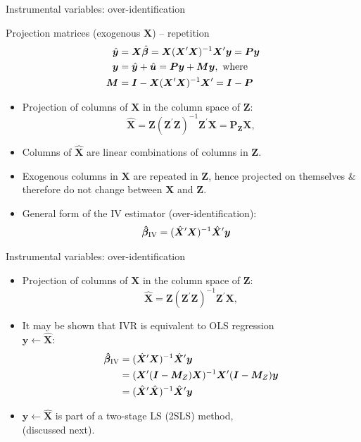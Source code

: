 \documentclass[usenames,dvipsnames]{beamer}
\begin{document}
\begin{frame}{Instrumental variables: over-identification}
\begin{block}{Projection matrices (exogenous $\bm{X}$) -- repetition}
\vspace{-0.5cm}
\begin{align*} 
\hat{\bm{y}} & = \bm{X}\hat{\bm{\beta}} =  
\bm{X}(\bm{X}^{\prime}\bm{X})^{-1} \bm{X}^{\prime}\bm{y} = \bm{Py}\\
\bm{y} & = \hat{\bm{y}} + \hat{\bm{u}} = \bm{Py} + \bm{My}, \textnormal{~where} \\
\bm{M} & = \bm{I}  - \bm{X}(\bm{X}^{\prime}\bm{X})^{-1} \bm{X}^{\prime} = \bm{I} - \bm{P}
\end{align*}
\end{block}
\begin{itemize}
    \item Projection of columns of $\bm{X}$ in the column space of $\bm{Z}$:
$$
\hat{\bm{X}} = 
\bm{Z}(\bm{Z}^{\prime}\bm{Z})^{-1} \bm{Z}^{\prime}\bm{X} = \bm{P}_{\bm{Z}}\bm{X},
$$
\item Columns of $\hat{\bm{X}}$ are linear combinations of columns in $\bm{Z}$. 
\medskip 
\item Exogenous columns in $\bm{X}$ are repeated in $\bm{Z}$, hence projected on themselves \& therefore do not change between $\bm{X}$ and $\bm{Z}$.
\medskip
\item General form of the IV estimator (over-identification):
\begin{align*}
 \bm{\hat{\beta}}_{\textnormal{IV}} &= (\hat{\bm{X}}^{\prime}\bm{X})^{-1} \hat{\bm{X}}^{\prime}\bm{y}
\end{align*}
\end{itemize}
\end{frame}
\begin{frame}{Instrumental variables: over-identification}
\begin{itemize} 
    \item Projection of columns of $\bm{X}$ in the column space of $\bm{Z}$:
$$
\hat{\bm{X}} = 
\bm{Z}(\bm{Z}^{\prime}\bm{Z})^{-1} \bm{Z}^{\prime}\bm{X},
$$
\item It may be shown that IVR is equivalent to OLS regression \\$\bm{y} \leftarrow \hat{\bm{X}}$:
\begin{align*}
 \bm{\hat{\beta}}_{\textnormal{IV}} &= 
 (\hat{\bm{X}}^{\prime}\bm{X})^{-1} \hat{\bm{X}}^{\prime}\bm{y} \\
 &= (\bm{X}^{\prime}(\bm{I}-\bm{M}_Z)\bm{X})^{-1} \bm{X}^{\prime}(\bm{I}-\bm{M}_Z)\bm{y} \\
 &= (\hat{\bm{X}}^{\prime}\hat{\bm{X}})^{-1} \hat{\bm{X}}^{\prime}\bm{y}
\end{align*}
\item $\bm{y} \leftarrow \hat{\bm{X}}$ is part of a two-stage LS (2SLS) method, \\(discussed next).
\end{itemize}
\end{frame}
\end{document}

